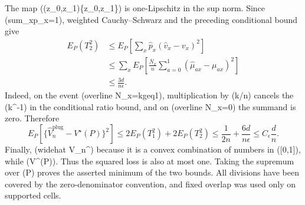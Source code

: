 The map ((z_0,z_1)\mapsto\max\{z_0,z_1\}) is one-Lipschitz in the sup norm.  Since (sum_x\widehat p_x=1), weighted Cauchy--Schwarz and the preceding conditional bound give
\[
 \begin{aligned}
 E_P(T_2^2)
 &\leq E_P\!\left[
   \sum_x\widehat p_x(\widehat v_x-v_x)^2
 \right]\\
 &\leq \sum_xE_P\!\left[
   \frac{\overline N_x}{n}
   \sum_{a=0}^1(\widehat\mu_{ax}-\mu_{ax})^2
 \right]\\
 &\leq \frac{3d}{n\epsilon}.
 \end{aligned}
\]
Indeed, on the event (overline N_x=kgeq1), multiplication by (k/n) cancels the (k^{-1}) in the conditional ratio bound, and on (overline N_x=0) the summand is zero.  Therefore
\[
 E_P\!\left[
   \{\widehat V_n^{\mathrm{plug}}-V^\star(P)\}^2
 \right]
 \leq 2E_P(T_1^2)+2E_P(T_2^2)
 \leq \frac1{2n}+\frac{6d}{n\epsilon}
 \leq C_\epsilon\frac d n.
\]
Finally, (widehat V_n^{}\in[0,1]) because it is a convex combination of numbers in ([0,1]), while (V^\star(P)\in[0,1]).  Thus the squared loss is also at most one.  Taking the supremum over (P) proves the asserted minimum of the two bounds.  All divisions have been covered by the zero-denominator convention, and fixed overlap was used only on supported cells.